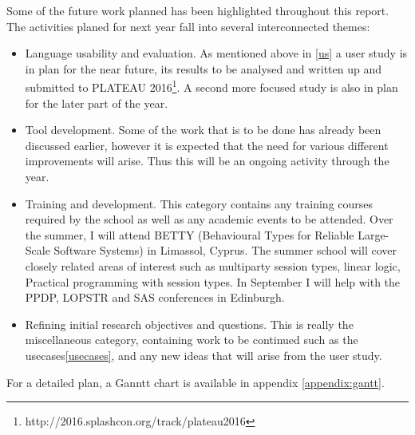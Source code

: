 Some of the future work planned has been highlighted throughout this report. The activities planed for next year fall into several interconnected themes:
\begin{itemize}
\item Language usability and evaluation. As mentioned above in \ref{us} a user study is in plan for the near future, its results to be analysed and written up and submitted to PLATEAU 2016\footnote{http://2016.splashcon.org/track/plateau2016}. A second more focused study is also in plan for the later part of the year. 
\item Tool development. Some of the work that is to be done has already been discussed earlier, however it is expected that the need for various different improvements will arise. Thus this will be an ongoing activity through the year. 
\item Training and development. This category contains any training courses required by the school as well as any academic events to be attended. Over the summer, I will attend BETTY (Behavioural Types for Reliable Large-Scale Software Systems) in Limassol, Cyprus. The summer school will cover closely related areas of interest such as multiparty session types, linear logic, Practical programming with session types. In September I will help with the PPDP, LOPSTR and SAS conferences in Edinburgh.
\item Refining initial research objectives and questions. This is really the miscellaneous category, containing work to be continued such as the usecases\ref{usecases}, and any new ideas that will arise from the user study.
\end{itemize}

For a detailed plan, a Ganntt chart is available in appendix \ref{appendix:gantt}.

